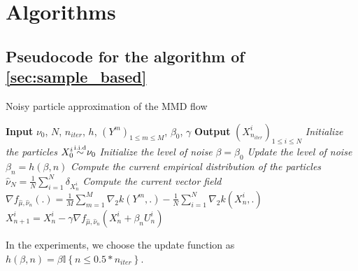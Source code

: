 %
%







\section{Algorithms}\label{sec:appendix_algorithms}

\subsection{Pseudocode for the algorithm of \cref{sec:sample_based}}\label{subsec:pseudocode}

\begin{algorithm}
	\caption{Noisy particle approximation of the MMD flow}\label{euclid}
	\begin{algorithmic}[1]
		\State \textbf{Input} $\nu_0$, $N$, $n_{iter}$, $h$, $(Y^m)_{1 \le m \le M}$, $\beta_0$, $\gamma$
		\State \textbf{Output} $(X^{i}_{n_{iter}})_{1\le i\le N}$
		\Statex \textit{Initialize the particles}
		\State $X_{0}^{i}\mysim \nu_0$
		\Statex \textit{Initialize the level of noise}
		\State $\beta=\beta_0$
		\Statex \textit{Update the level of noise}
		\State $\beta_n=h(\beta, n)$
		\Statex \textit{Compute the current empirical distribution of the particles}
		\State $\widehat{\nu}_N=\frac{1}{N}\sum_{i=1}^N \delta_{X^{i}_n}$
		\Statex \textit{Compute the current vector field}
		\State $\nabla f_{\hat{\mu},\hat{\nu}_n}(.) = \frac{1}{M}\sum\limits_{m=1}^M \nabla_2 k(Y^m,.)-\frac{1}{N}\sum\limits_{i=1}^N \nabla_2 k(X_n^i,.)$
		\State $X_{n+1}^{i} = X_n^i -\gamma \nabla f_{\hat{\mu},\hat{\nu}_n}(X_n^i+\beta_n U_n^i)$
		\EndFor
		\EndFor
	\end{algorithmic}
\end{algorithm}

In the experiments, we choose the update function as $h(\beta,n)=\beta \mathbb{I}\left\{n\le 0.5*n_{iter}\right\}$.






